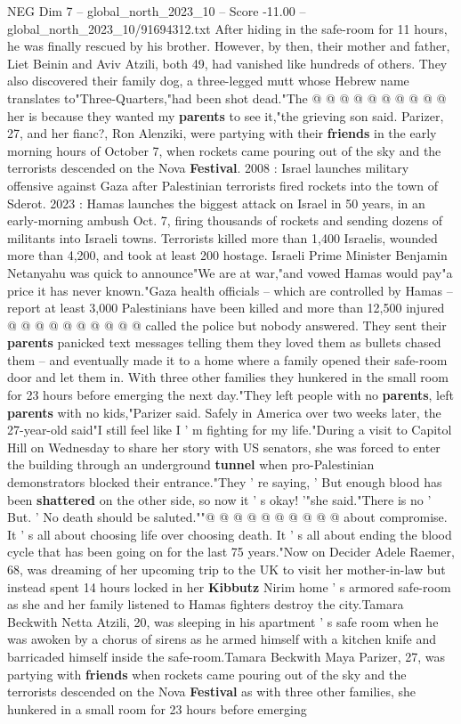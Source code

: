 \begin{textsample}{NEG Dim 7 – global\_north\_2023\_10 – Score -11.00 – global\_north\_2023\_10/91694312.txt}
After hiding in the safe-room for 11 hours, he was finally rescued by his brother.
However, by then, their mother and father, Liet Beinin and Aviv Atzili, both 49, had vanished like hundreds of others.
They also discovered their family dog, a three-legged mutt whose Hebrew name translates to"Three-Quarters,"had been shot dead."The @ @ @ @ @ @ @ @ @ @ her is because they wanted my \textbf{parents} to see it,"the grieving son said.
Parizer, 27, and her fianc?, Ron Alenziki, were partying with their \textbf{friends} in the early morning hours of October 7, when rockets came pouring out of the sky and the terrorists descended on the Nova \textbf{Festival}. 2008 : Israel launches military offensive against Gaza after Palestinian terrorists fired rockets into the town of Sderot. 2023 : Hamas launches the biggest attack on Israel in 50 years, in an early-morning ambush Oct. 7, firing thousands of rockets and sending dozens of militants into Israeli towns.
Terrorists killed more than 1,400 Israelis, wounded more than 4,200, and took at least 200 hostage.
Israeli Prime Minister Benjamin Netanyahu was quick to announce"We are at war,"and vowed Hamas would pay"a price it has never known."Gaza health officials -- which are controlled by Hamas -- report at least 3,000 Palestinians have been killed and more than 12,500 injured @ @ @ @ @ @ @ @ @ @ called the police but nobody answered.
They sent their \textbf{parents} panicked text messages telling them they loved them as bullets chased them -- and eventually made it to a home where a family opened their safe-room door and let them in.
With three other families they hunkered in the small room for 23 hours before emerging the next day."They left people with no \textbf{parents}, left \textbf{parents} with no kids,"Parizer said.
Safely in America over two weeks later, the 27-year-old said"I still feel like I ' m fighting for my life."During a visit to Capitol Hill on Wednesday to share her story with US senators, she was forced to enter the building through an underground \textbf{tunnel} when pro-Palestinian demonstrators blocked their entrance."They ' re saying, ' But enough blood has been \textbf{shattered} on the other side, so now it ' s okay! '"she said."There is no ' But. ' No death should be saluted.""@ @ @ @ @ @ @ @ @ @ about compromise.
It ' s all about choosing life over choosing death.
It ' s all about ending the blood cycle that has been going on for the last 75 years."Now on Decider Adele Raemer, 68, was dreaming of her upcoming trip to the UK to visit her mother-in-law but instead spent 14 hours locked in her \textbf{Kibbutz} Nirim home ' s armored safe-room as she and her family listened to Hamas fighters destroy the city.Tamara Beckwith Netta Atzili, 20, was sleeping in his apartment ' s safe room when he was awoken by a chorus of sirens as he armed himself with a kitchen knife and barricaded himself inside the safe-room.Tamara Beckwith Maya Parizer, 27, was partying with \textbf{friends} when rockets came pouring out of the sky and the terrorists descended on the Nova \textbf{Festival} as with three other families, she hunkered in a small room for 23 hours before emerging


\end{textsample}
